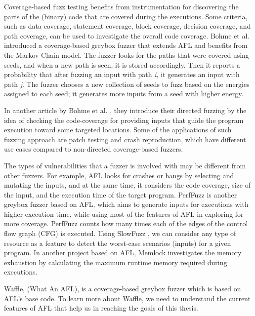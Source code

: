 
\vspace{1.5\baselineskip}

Coverage-based fuzz testing benefits from instrumentation for discovering the parts of the (binary) code that are covered during the executions. Some criteria, such as data coverage, statement coverage, block coverage, decision coverage, and path coverage, can be used to investigate the overall code coverage. \cite{yang2009survey} Bohme et al. \cite{bohme2017coverage} introduced a coverage-based greybox fuzzer that extends AFL and benefits from the Markov Chain model. The fuzzer looks for the paths that were covered using seeds, and when a new path is seen, it is stored accordingly. Then it reports a probability that after fuzzing an input with path \textit{i}, it generates an input with path \textit{j}. The fuzzer chooses a new collection of seeds to fuzz based on the energies assigned to each seed; it generates more inputs from a seed with higher energy.

In another article by Bohme et al. \cite{bohme2017directed}, they introduce their directed fuzzing by the idea of checking the code-coverage for providing inputs that guide the program execution toward some targeted locations. Some of the applications of such fuzzing approach are patch testing and crash reproduction, which have different use cases compared to non-directed coverage-based fuzzers.

\vspace{1.5\baselineskip}


The types of vulnerabilities that a fuzzer is involved with may be different from other fuzzers. For example, AFL looks for crashes or hangs by selecting and mutating the inputs, and at the same time, it considers the code coverage, size of the input, and the execution time of the target program. PerfFuzz \cite{lemieux2018perffuzz} is another greybox fuzzer based on AFL, which aims to generate inputs for executions with higher execution time, while using most of the features of AFL in exploring for more coverage. PerfFuzz counts how many times each of the edges of the control flow graph (CFG) is executed. Using SlowFuzz \cite{petsios2017slowfuzz}, we can consider any type of resource as a feature to detect the worst-case scenarios (inputs) for a given program. In another project based on AFL, Memlock \cite{wen2020memlock} investigates the memory exhaustion by calculating the maximum runtime memory required during executions.

Waffle, (What An AFL), is a coverage-based greybox fuzzer which is based on AFL's base code. To learn more about Waffle, we need to understand the current features of AFL that help us in reaching the goals of this thesis.


